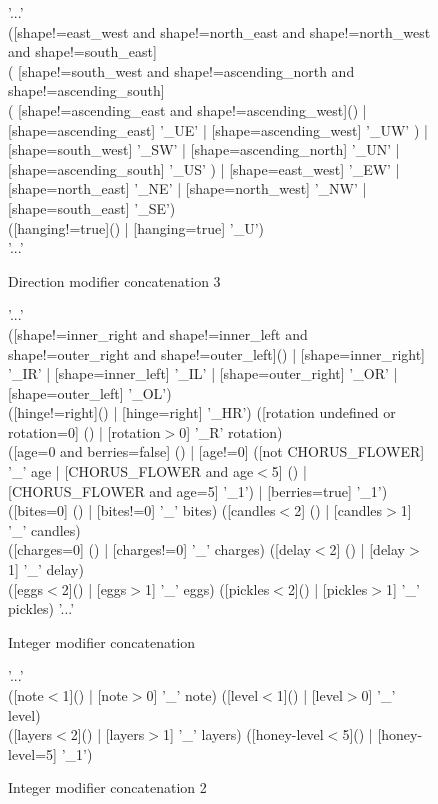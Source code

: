 \begin{subfigures}
	\begin{figure}
		\begin{rail}
			'...' \\
			([shape!=east\_west and shape!=north\_east and shape!=north\_west and shape!=south\_east] \\ (
				[shape!=south\_west and shape!=ascending\_north and shape!=ascending\_south] \\ (
					[shape!=ascending\_east and shape!=ascending\_west]() |
					[shape=ascending\_east] '\_UE' |
					[shape=ascending\_west] '\_UW'
				) |
				[shape=south\_west] '\_SW' |
				[shape=ascending\_north] '\_UN' |
				[shape=ascending\_south] '\_US'
			) |
			[shape=east\_west] '\_EW' |
			[shape=north\_east] '\_NE' |
			[shape=north\_west] '\_NW' |
			[shape=south\_east] '\_SE') \\
			([hanging!=true]() | [hanging=true] '\_U') \\
			'...'
		\end{rail}
		\caption{Direction modifier concatenation 3}
	\end{figure}
	
	\begin{figure}
		\begin{rail}
			'...' \\
			([shape!=inner\_right and shape!=inner\_left and shape!=outer\_right and shape!=outer\_left]() | [shape=inner\_right] '\_IR' | [shape=inner\_left] '\_IL' | [shape=outer\_right] '\_OR' | [shape=outer\_left] '\_OL') \\
			([hinge!=right]() | [hinge=right] '\_HR')
			([rotation undefined or rotation=0] () | [rotation$>$0] '\_R' rotation) \\
			([age=0 and berries=false] () | [age!=0] ([not CHORUS\_FLOWER] '\_' age | [CHORUS\_FLOWER and age$<$5] () | [CHORUS\_FLOWER and age=5] '\_1') | [berries=true] '\_1') \\
			([bites=0] () | [bites!=0] '\_' bites) ([candles$<$2] () | [candles$>$1] '\_' candles) \\
			([charges=0] () | [charges!=0] '\_' charges) ([delay$<$2] () | [delay$>$1] '\_' delay) \\
			([eggs$<$2]() | [eggs$>$1] '\_' eggs) ([pickles$<$2]() | [pickles$>$1] '\_' pickles)
			'...'
		\end{rail}
		\caption{Integer modifier concatenation}
	\end{figure}
	
	\begin{figure}
		\begin{rail}
			'...' \\
			([note$<$1]() | [note$>$0] '\_' note) ([level$<$1]() | [level$>$0] '\_' level) \\
			([layers$<$2]() | [layers$>$1] '\_' layers) ([honey-level$<$5]() | [honey-level=5] '\_1')
		\end{rail}
		\caption{Integer modifier concatenation 2}
	\end{figure}
\end{subfigures}